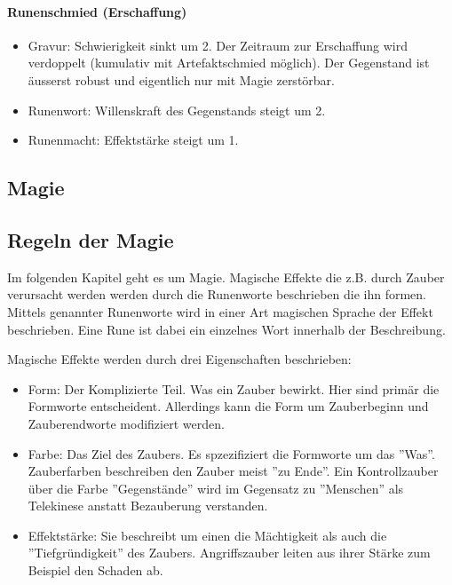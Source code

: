 \documentclass{article}
\begin{document}
\paragraph{Runenschmied (Erschaffung)}

\begin{itemize}
\item Gravur: Schwierigkeit sinkt um 2. Der Zeitraum zur Erschaffung wird verdoppelt (kumulativ mit Artefaktschmied möglich). Der Gegenstand ist äusserst robust und eigentlich nur mit Magie zerstörbar.
\item Runenwort: Willenskraft des Gegenstands steigt um 2.
\item Runenmacht: Effektstärke steigt um 1.
\end{itemize}

\begin{center}
\section{Magie}
\end{center}

\begin{center}
\subsection{Regeln der Magie}
\end{center}

Im folgenden Kapitel geht es um Magie. Magische Effekte die z.B. durch Zauber verursacht werden werden durch die
Runenworte beschrieben die ihn formen. Mittels genannter Runenworte wird in einer Art magischen Sprache der Effekt
beschrieben. Eine Rune ist dabei ein einzelnes Wort innerhalb der Beschreibung.

Magische Effekte werden durch drei Eigenschaften beschrieben:

\begin{itemize}
\item Form: Der Komplizierte Teil. Was ein Zauber bewirkt. Hier sind primär die Formworte entscheident. Allerdings kann die Form um Zauberbeginn und Zauberendworte modifiziert werden.
\item Farbe: Das Ziel des Zaubers. Es spzezifiziert die Formworte um das ''Was''. Zauberfarben beschreiben den Zauber meist ''zu Ende''. Ein Kontrollzauber über die Farbe ''Gegenstände'' wird im Gegensatz zu ''Menschen'' als Telekinese anstatt Bezauberung verstanden.
\item Effektstärke: Sie beschreibt um einen die Mächtigkeit als auch die ''Tiefgründigkeit'' des Zaubers. Angriffszauber leiten aus ihrer Stärke zum Beispiel den Schaden ab.
\end{itemize}
\end{document}
